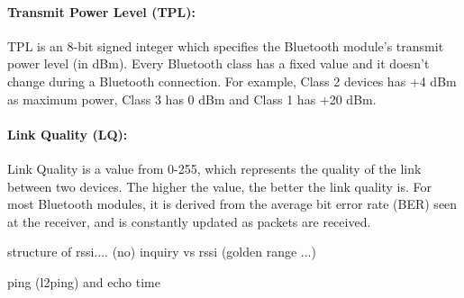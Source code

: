 \paragraph{Transmit Power Level (TPL):}
TPL is an 8-bit signed integer which specifies the Bluetooth module's transmit power level (in dBm). Every Bluetooth class has a fixed value and it doesn't change during a Bluetooth connection. For example, Class 2 devices has +4 dBm as maximum power, Class 3 has 0 dBm and Class 1 has +20 dBm.

\paragraph{Link Quality (LQ):}
Link Quality is a value from 0-255, which represents the quality of the link between two devices. The higher the value, the better the link quality is. For most Bluetooth modules, it is derived from the average bit error rate (BER) seen at the receiver, and is constantly updated as packets are received.

structure of rssi.... (no)
inquiry vs rssi (golden range ...)

ping (l2ping) and echo time